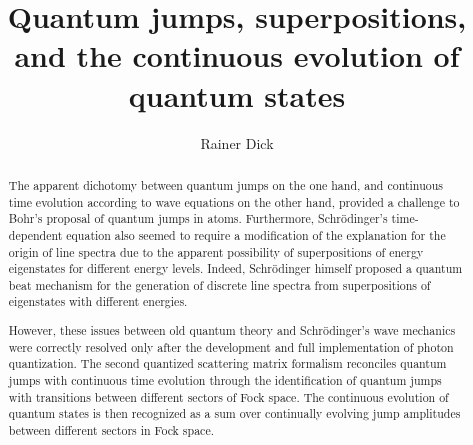 \documentclass[final,3p,times,twocolumn]{elsarticle3}
\begin{document}
\begin{frontmatter}



\title{Quantum jumps, superpositions, and the continuous evolution of quantum states}



\author{Rainer Dick}


\address{Department of Physics and Engineering Physics, 
University of Saskatchewan, Saskatoon, Canada SK S7N 5E2\\
}

\begin{abstract}
The apparent dichotomy between quantum jumps on the one hand,
and continuous time evolution according to wave equations on the other hand,
provided a challenge to Bohr's proposal of quantum jumps in atoms.
 Furthermore, Schr\"odinger's time-dependent equation also seemed to
require a modification of the explanation for the origin of line
spectra due to the apparent possibility of superpositions of energy
eigenstates for different energy levels.
Indeed, Schr\"odinger himself proposed a quantum beat mechanism for the generation
of discrete line spectra from superpositions of eigenstates with different energies.

However, these issues between old quantum theory and Schr\"odinger's
wave mechanics were correctly resolved only after the development 
and full implementation of photon quantization.
The second quantized scattering matrix formalism reconciles quantum jumps with 
continuous time evolution through the identification of quantum jumps with
transitions between different sectors of Fock space. The
continuous evolution of quantum states is then recognized as a sum over continually 
evolving jump amplitudes between different sectors in Fock space.


\end{abstract}
\end{frontmatter}
\end{document}

